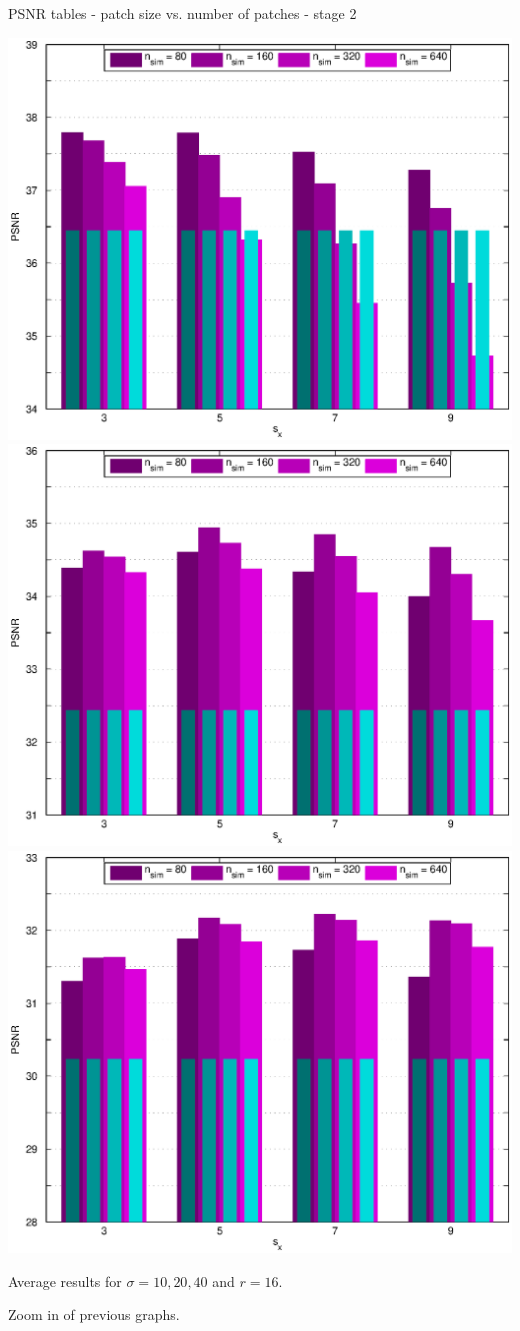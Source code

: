 \documentclass[mathserif, 8pt]{beamer}
\begin{document}
\begin{frame}{PSNR tables - patch size vs. number of patches - stage 2}
	\begin{center}
		\includegraphics[width=.33\textwidth]{zoom_psnr_px2-np2-bars_2r16_s10_average.eps}%
		\includegraphics[width=.33\textwidth]{zoom_psnr_px2-np2-bars_2r16_s20_average.eps}%
		\includegraphics[width=.33\textwidth]{zoom_psnr_px2-np2-bars_2r16_s40_average.eps}
	\end{center}
	\begin{center}
	Average results for $\sigma = 10, 20, 40$ and $r = 16$. 
	\bigskip
	
	Zoom in of previous graphs.
	\end{center}
\end{frame}
\end{document}
